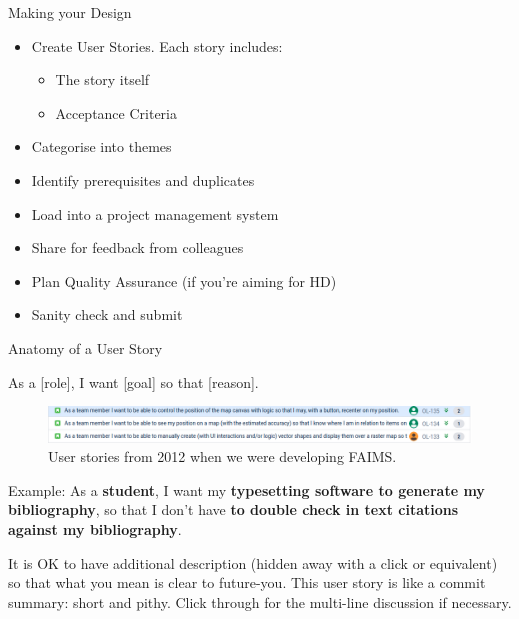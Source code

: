 \documentclass[aspectratio=1610, 11pt]{beamer} %
\begin{document}
\begin{frame}{Making your Design}

\begin{itemize}[label=\textbullet]
    \item Create User Stories. Each story includes:
    \begin{itemize}[label=\textbullet]
        \item The story itself
        \item Acceptance Criteria
    \end{itemize}
    \item Categorise into themes 
    \item Identify prerequisites and duplicates
    \item Load into a project management system
    \item Share for feedback from colleagues
    \item Plan Quality Assurance (if you're aiming for HD)
    \item Sanity check and submit
\end{itemize}
    
\end{frame}

\begin{frame}{Anatomy of a User Story}

{\huge As a [role], I want [goal] so that [reason].}

\begin{figure}
    \centering
    \includegraphics[width=\textwidth]{figures/userstories.png}
    \caption{User stories from 2012 when we were developing FAIMS.}
    \label{fig:userstory}
\end{figure}

Example: As a \textbf{student}, I want my \textbf{typesetting software to generate my bibliography}, so that I don’t have \textbf{to double check in text citations against my bibliography}.

It is OK to have additional description (hidden away with a click or equivalent) so that what you mean is clear to future-you. This user story is like a commit summary: short and pithy. Click through for the multi-line discussion if necessary.
\end{frame}
\end{document}
